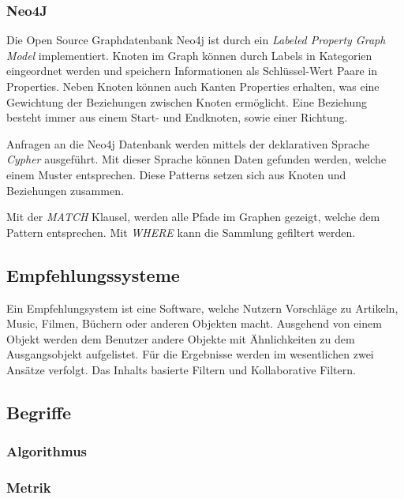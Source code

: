 	\subsubsection{Neo4J}
	
	Die Open Source Graphdatenbank Neo4j ist durch ein \textit{Labeled Property Graph Model} implementiert. Knoten im Graph können durch Labels in Kategorien eingeordnet werden und speichern Informationen als Schlüssel-Wert Paare in Properties. 
	Neben Knoten können auch Kanten Properties erhalten, was eine Gewichtung der Beziehungen zwischen Knoten ermöglicht. Eine Beziehung besteht immer aus einem Start- und Endknoten, sowie einer Richtung.\cite[26]{Robinson2015}
	
	Anfragen an die Neo4j Datenbank werden mittels der deklarativen Sprache \textit{Cypher} ausgeführt. Mit dieser Sprache können Daten gefunden werden, welche einem Muster  entsprechen. Diese Patterns setzen sich aus Knoten und Beziehungen zusammen. 
	
% 

Mit der \textit{MATCH} Klausel, werden alle Pfade im Graphen gezeigt, welche dem Pattern entsprechen. Mit \textit{WHERE} kann die Sammlung gefiltert werden.

\subsection{Empfehlungssysteme}

Ein Empfehlungsystem ist eine Software, welche Nutzern Vorschläge zu Artikeln, Music, Filmen, Büchern oder anderen Objekten macht. \cite{Ricci2010} Ausgehend von einem Objekt werden dem Benutzer andere Objekte mit Ähnlichkeiten zu dem Ausgangsobjekt aufgelistet. Für die Ergebnisse werden im wesentlichen zwei Ansätze verfolgt. Das Inhalts basierte Filtern und Kollaborative Filtern.

\subsection{Begriffe}

\subsubsection{Algorithmus}
\subsubsection{Metrik}


 
	